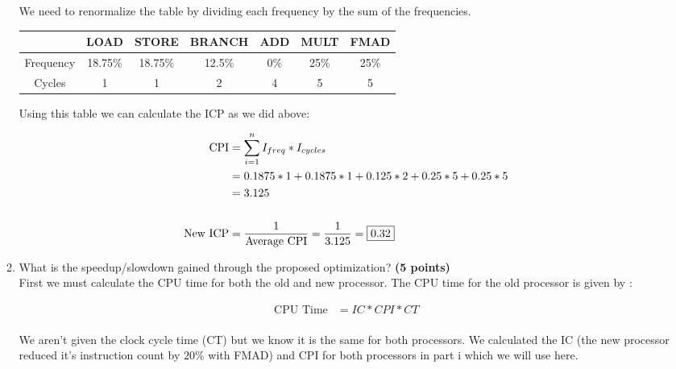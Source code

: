 \documentclass[a4paper, 15pt]{exam}
\begin{document}
\begin{enumerate}
\begin{enumerate}
\begin{center}
\begin{tabular}{ |c|c|c|c|c|c|c| }
\hline
\end{tabular}
\end{center}

We need to renormalize the table by dividing each frequency by the sum of the frequencies.

   	   \begin{center}
\begin{tabular}{ |c|c|c|c|c|c|c| } 
 \hline
  & LOAD & STORE & BRANCH & ADD & MULT & FMAD \\ 
  \hline
 Frequency & 18.75\% & 18.75\% & 12.5\% & 0\% & 25\% & 25\% \\ \hline
 Cycles & 1 & 1 & 2 &4 & 5 & 5\\ 

\hline
\end{tabular}
\end{center}

Using this table we can calculate the ICP as we did above:

   \begin{align*} 
   			\text{CPI} &= \sum_{i = 1}^n I_{freq} * I_{cycles} \\
   			  			&= 0.1875 * 1 + 0.1875 * 1 + 0.125 * 2 + 0.25 * 5 + 0.25 * 5 \\
   			  			&= 3.125 \\ \\
   			  			\text{New ICP} &= \frac{1}{\text{Average CPI}} = \frac{1}{3.125} = \fbox{0.32}
   	\end{align*}
   	
    \item What is the speedup/slowdown gained through the proposed optimization?  \textbf{(5 points)} \\
   First we must calculate the CPU time for both the old and new processor. The CPU time for the old processor is given by :
   
   \begin{align*} 
   			\text{CPU Time} &= IC * CPI * CT \\
   	\end{align*}
   	
   	We aren't given the clock cycle time (CT) but we know it is the same for both processors. We calculated the IC (the new processor reduced it's instruction count by $20\%$ with FMAD) and CPI for both processors in part i which we will use here.
   	

\end{enumerate}
\end{enumerate}
\end{document}
